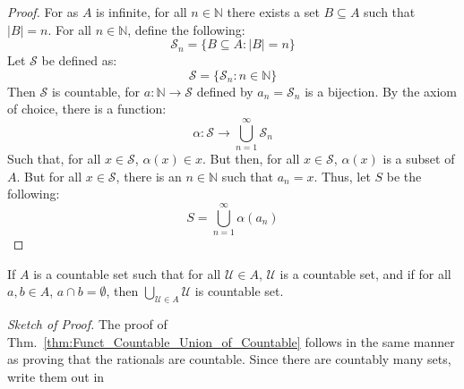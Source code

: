             \begin{proof}
                For as $A$ is infinite, for all $n\in\mathbb{N}$
                there exists a set $B\subseteq{A}$ such that
                $|B|=n$. For all $n\in\mathbb{N}$,
                define the following:
                \begin{equation}
                    \mathcal{S}_{n}=\{B\subseteq{A}:|B|=n\}
                \end{equation}
                Let $\mathcal{S}$ be defined as:
                \begin{equation}
                    \mathcal{S}=\{\mathcal{S}_{n}:n\in\mathbb{N}\}
                \end{equation}
                Then $\mathcal{S}$ is countable, for
                $a:\mathbb{N}\rightarrow\mathcal{S}$ defined
                by $a_{n}=\mathcal{S}_{n}$ is a bijection.
                By the axiom of choice, there is a function:
                \begin{equation}
                    \alpha:\mathcal{S}\rightarrow
                    \bigcup_{n=1}^{\infty}\mathcal{S}_{n}
                \end{equation}
                Such that, for all $x\in\mathcal{S}$,
                $\alpha(x)\in{x}$. But then, for all
                $x\in\mathcal{S}$, $\alpha(x)$ is a subset
                of $A$. But for all $x\in\mathcal{S}$, there
                is an $n\in\mathbb{N}$ such that
                $a_{n}=x$. Thus, let $S$ be the following:
                \begin{equation}
                    S=\bigcup_{n=1}^{\infty}\alpha(a_{n})
                \end{equation}
            \end{proof}
            \begin{theorem}
                \label{thm:Funct_Countable_Union_of_Countable}
                If $A$ is a countable set such that for all
                $\mathcal{U}\in{A}$, $\mathcal{U}$ is a
                countable set, and if for all $a,b\in{A}$,
                $a\cap{b}=\emptyset$, then
                $\bigcup_{\mathcal{U}\in{A}}\mathcal{U}$
                is countable set.
            \end{theorem}
            \textit{Sketch of Proof.} The proof of
            Thm.~\ref{thm:Funct_Countable_Union_of_Countable}
            follows in the same manner
            as proving that the rationals are countable. Since
            there are countably many sets, write them out in
